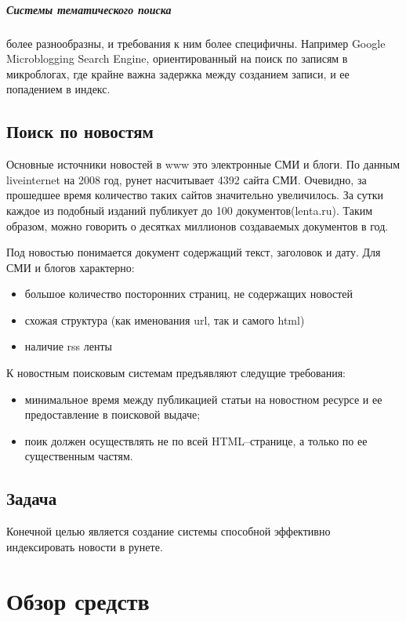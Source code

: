 \paragraph{Системы тематического поиска} более разнообразны, и требования к ним более специфичны.
 Например Google Microblogging Search Engine, ориентированный на поиск по записям в микроблогах,
где крайне важна задержка между созданием записи, и ее попадением в индекс.

\section{Поиск по новостям}

Основные источники новостей в www это электронные СМИ и блоги. По данным
liveinternet на 2008 год, рунет насчитывает 4392 сайта СМИ. 
Очевидно, за прошедшее время количество таких сайтов значительно увеличилось. За сутки каждое
из подобный изданий публикует до 100 документов(lenta.ru). Таким образом, 
можно говорить о десятках миллионов создаваемых документов в год.

Под новостью понимается документ содержащий текст, заголовок и дату. Для СМИ и
блогов характерно:
\begin{itemize} 
 \item большое количество посторонних страниц, не содержащих новостей
 \item схожая структура (как именования url, так и самого html)
 \item наличие rss ленты
\end{itemize}

К новостным поисковым системам предъявляют следущие требования:
\begin{itemize} 
\item минимальное время между публикацией статьи на новостном ресурсе и ее 
    предоставление в поисковой выдаче;
\item поик должен осуществлять не по всей HTML--странице, а только по ее 
    существенным частям. 
\end{itemize}

\section{Задача}
Конечной целью является создание системы способной эффективно индексировать новости в рунете.

\chapter{Обзор средств}
